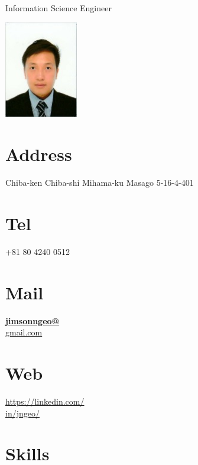 \documentclass[]{friggeri-cv}
\begin{document}
       {Information Science Engineer}
      
\vspace{-5mm}

\begin{aside}
  \includegraphics[scale=0.8]{img/JimsonNgeo_3x4photo.jpg}
  \section{Address}
    Chiba-ken Chiba-shi Mihama-ku
    Masago 5-16-4-401
    ~
  \section{Tel}
    +81 80 4240 0512
    ~
  \section{Mail}
    \href{mailto:jimsonngeo@gmail.com}{\textbf{jimsonngeo@}\\gmail.com}
    ~
  \section{Web}
    \href{https://www.linkedin.com/in/jngeo/}{https://linkedin.com/\\in/jngeo/}
    ~
  \section{Skills}
    ~

\end{aside}
\end{document}
